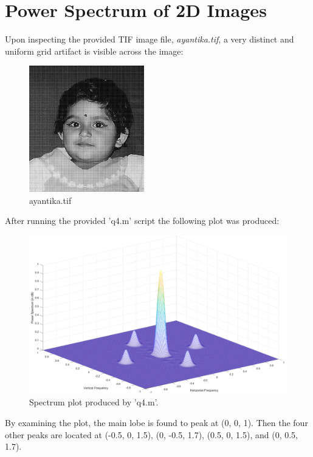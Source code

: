 \documentclass[a4paper, 10pt]{article}
\begin{document}
\section{Power Spectrum of 2D Images}
Upon inspecting the provided TIF image file, \textit{ayantika.tif}, a very distinct and uniform
grid artifact is visible across the image:
\begin{figure}[H]
  \centering
  \includegraphics[width=5cm]{images/ayantika.png}
  \caption{ayantika.tif}
\end{figure}
After running the provided 'q4.m' script the following plot was produced:
\begin{figure}[H]
  \centering
  \includegraphics[width=16cm]{images/q4c.png}
  \caption{Spectrum plot produced by 'q4.m'.}
\end{figure}
\noindent By examining the plot, the main lobe is found to peak at (0, 0, 1). Then the four other peaks are located at 
(-0.5, 0, 1.5), (0, -0.5, 1.7), (0.5, 0, 1.5), and (0, 0.5, 1.7).
\end{document}
